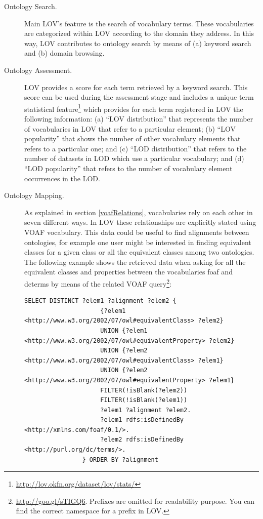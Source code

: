 \begin{description}%
		\item [Ontology Search.] Main LOV's feature is the search of vocabulary terms. These vocabularies are categorized within LOV according to the domain they address. In this way, LOV contributes to ontology search by means of (a) keyword search and (b) domain browsing.
		\item [Ontology Assessment.] LOV provides a score for each term retrieved by a keyword search. This score can be used during the assessment stage and includes a unique term statistical feature\footnote{\url{http://lov.okfn.org/dataset/lov/stats/}} which provides for each term registered in LOV the following information: (a) ``LOV distribution'' that represents the number of vocabularies in LOV that refer to a particular element; (b) ``LOV popularity'' that shows the number of other vocabulary elements that refers to a particular one; and (c) ``LOD distribution'' that refers to the number of datasets in LOD which use a particular vocabulary; and (d) ``LOD popularity'' that refers to the number of vocabulary element occurrences in the LOD.
		\item [Ontology Mapping.] As explained in section \ref{voafRelations}, vocabularies rely on each other in seven different ways. In LOV these relationships are explicitly stated using VOAF vocabulary. This data could be useful to find alignments between ontologies, for example one user might be interested in finding equivalent classes for a given class or all the equivalent classes among two ontologies. The following example shows the retrieved data when asking for all the equivalent classes and properties between the vocabularies foaf and dcterms by means of the related VOAF query\footnote{\url{http://goo.gl/sTIGQ6}. Prefixes are omitted for readability purpose. You can find the correct namespace for a prefix in LOV.}: 
				
		{\small\begin{verbatim}SELECT DISTINCT ?elem1 ?alignment ?elem2 {
				     {?elem1 <http://www.w3.org/2002/07/owl#equivalentClass> ?elem2}
				     UNION {?elem1 <http://www.w3.org/2002/07/owl#equivalentProperty> ?elem2}
				     UNION {?elem2 <http://www.w3.org/2002/07/owl#equivalentClass> ?elem1}
				     UNION {?elem2 <http://www.w3.org/2002/07/owl#equivalentProperty> ?elem1}
				     FILTER(!isBlank(?elem2))
				     FILTER(!isBlank(?elem1))
				     ?elem1 ?alignment ?elem2.
				     ?elem1 rdfs:isDefinedBy <http://xmlns.com/foaf/0.1/>.
				     ?elem2 rdfs:isDefinedBy <http://purl.org/dc/terms/>.
				} ORDER BY ?alignment\end{verbatim}}
				

\end{description}
